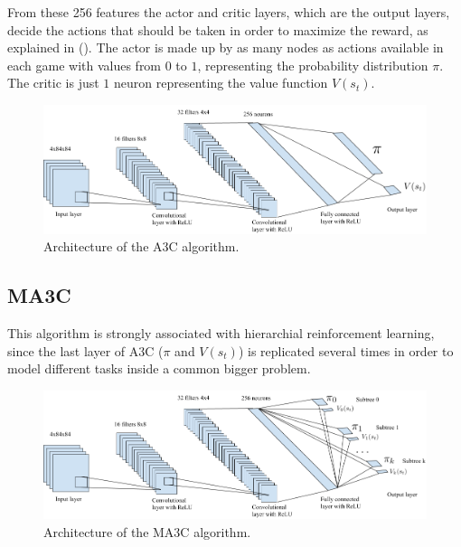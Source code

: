 From these 256 features the actor and critic layers, which are the output layers, decide the actions that should be taken
in order to maximize the reward, as explained in ().
The actor is made up by as many nodes as actions available in each game with values from $0$ to $1$, representing the
probability distribution $\pi$.
The critic is just $1$ neuron representing the value function $V(s_t)$.

\begin{figure}[hbtp]
\begin{center}
\includegraphics[width=430]{img/A3C_architecture.png}
\end{center}
\caption[A3C architecture]
{Architecture of the \ac{A3C} algorithm.}
\label{fig:A3C}
\end{figure}

\subsection{\acl{MA3C}\label{subsec:MA3C}}

This algorithm is strongly associated with hierarchial reinforcement learning, since the last layer of \ac{A3C}
($\pi$ and $V(s_t)$) is replicated several times in order to model different tasks inside a common bigger problem.

\begin{figure}[hbtp]
\begin{center}
\includegraphics[width=430]{img/MA3C_architecture.png}
\end{center}
\caption[MA3C architecture]
{Architecture of the \ac{MA3C} algorithm.}
\label{fig:MA3C}
\end{figure}


